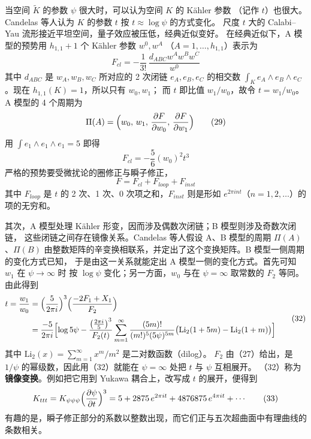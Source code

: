 当空间 $\tilde K$ 的参数 $\psi$ 很大时，可以认为空间 $K$ 的 Kähler 参数
（记作 $t$）也很大。Candelas 等人认为 $K$ 的参数 $t$ 按 $t\approx\log\psi$ 的方式变化。
尺度 $t$ 大的 Calabi--Yau 流形接近平坦空间，量子效应被压低，经典近似变好。
在经典近似下，A 模型的预势用 $h_{1,1}+1$ 个 Kähler 参数 $w^0,w^A$
（$A=1,\dots,h_{1,1}$）表示为
\begin{equation}
  F_{cl}=-\frac{1}{3!}\,\frac{d_{ABC}w^{A}w^{B}w^{C}}{w^{0}} \tag{28}
\end{equation}
其中 $d_{ABC}$ 是 $w_A,w_B,w_C$ 所对应的 2 次闭链 $e_A,e_B,e_C$ 的相交数
$\int_K e_A\wedge e_B\wedge e_C$。现在 $h_{1,1}(K)=1$，所以只有 $w_0,w_1$；
而 $t$ 即比值 $w_1/w_0$，故令 $t=w_1/w_0$。A 模型的 4 个周期为
\begin{equation}
  \Pi(A)=\Bigl(w_0,\,w_1,\,\frac{\partial F}{\partial w_0},\,\frac{\partial F}{\partial w_1}\Bigr) \tag{29}
\end{equation}
用 $\int e_1\wedge e_1\wedge e_1=5$ 即得
\begin{equation}
  F_{cl}=-\frac{5}{6}(w_0)^2t^3 \tag{30}
\end{equation}
严格的预势要受微扰论的圈修正与瞬子修正，
\begin{equation}
  F=F_{cl}+F_{loop}+F_{inst} \tag{31}
\end{equation}
其中 $F_{loop}$ 是 $t$ 的 2 次、1 次、0 次项之和，$F_{inst}$ 则是形如
$e^{2\pi i n t}$（$n=1,2,\dots$）的项的无穷和。

其次，A 模型处理 Kähler 形变，因而涉及偶数次闭链；B 模型则涉及奇数次闭链，
这些闭链之间存在镜像关系。Candelas 等人假设 A、B 模型的周期 $\Pi(A)$、$\Pi(B)$
由整数矩阵的辛变换相联系，并定出了这个变换矩阵。B 模型一侧周期的变化方式已知，
于是由这一关系就能定出 A 模型一侧的变化方式。首先可知 $w_1$ 在 $\psi\to\infty$ 时
按 $\log\psi$ 变化；另一方面，$w_0$ 与在 $\psi=\infty$ 取常数的 $F_2$ 等同。
由此得到
\begin{equation}
  \begin{aligned}
    t=\frac{w_1}{w_0}&=\Bigl(\frac{5}{2\pi i}\Bigr)^3
      \Bigl(\frac{-2F_1+X_1}{F_2}\Bigr)\\[2pt]
    &=\frac{-5}{2\pi i}\Bigl[\log 5\psi
      -\frac{\bigl(\frac{2\pi i}{5}\bigr)^3}{F_2(t)}
      \sum_{m=1}^{\infty}\frac{(5m)!}{(m!)^5(5\psi)^{5m}}
      \bigl(\mathrm{Li}_2(1+5m)-\mathrm{Li}_2(1+m)\bigr)\Bigr]
  \end{aligned} \tag{32}
\end{equation}
其中 $\mathrm{Li}_2(x)=\sum_{m=1}^{\infty}x^m/m^2$ 是二对数函数（dilog）。
$F_2$ 由（27）给出，是
$1/\psi$ 的幂级数，因此用（32）就能在 $\psi=\infty$ 处把 $t$ 与 $\psi$ 互相展开。
（32）称为\textbf{镜像变换}。例如把它用到 Yukawa 耦合上，改写成 $t$ 的展开，便得到
\begin{equation}
  K_{ttt}=K_{\psi\psi\psi}\Bigl(\frac{\partial\psi}{\partial t}\Bigr)^3
  =5+2875\,e^{2\pi it}+4876875\,e^{4\pi it}+\cdots \tag{33}
\end{equation}
有趣的是，瞬子修正部分的系数以整数出现，而它们正与五次超曲面中有理曲线的条数相关。


